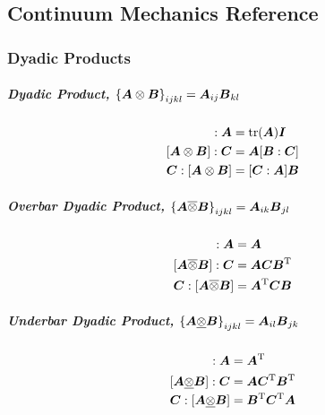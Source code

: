\documentclass[10pt,letterpaper,oneside]{report}
\newcommand{\ten}[1]{\mbox{\boldmath $#1$}{}}
\newcommand{\scas}[1]{\mbox{{\scriptsize{${\rm{#1}}$}}}{}}
\begin{document}
\begin{itemize}
\appendix

\chapter{Continuum Mechanics Reference}

\subsection{Dyadic Products} 
\paragraph{Dyadic Product, $\left\lbrace \ten{A} \otimes \ten{B} \right\rbrace _{ijkl} = \ten{A}_{ij} \ten{B}_{kl} $}
\begin{align}
[\ten{I} \otimes \ten{I} ] : \ten{A} &= \mbox{tr} (\ten{A}) \ten{I} 
\\
[\ten{A} \otimes \ten{B}] : \ten{C} &= \ten{A} [\ten{B}:\ten{C}] 
\\
\ten{C}:[\ten{A} \otimes \ten{B}] &= [\ten{C}:\ten{A}] \ten{B} 
\end{align}

\paragraph{Overbar Dyadic Product, $\left\lbrace \ten{A} \overline{\otimes} \ten{B} \right\rbrace _{ijkl} = \ten{A}_{ik} \ten{B}_{jl}$}
\begin{align}
[\ten{I} \overline{\otimes} \ten{I} ] : \ten{A} &= \ten{A}  
\\
[\ten{A} \overline{\otimes} \ten{B}] : \ten{C} &= \ten{A} \ten{C} \ten{B}^{\scas{T}} 
\\
\ten{C}:[\ten{A} \overline{\otimes} \ten{B}] &= \ten{A}^{\scas{T}} \ten{C} \ten{B} 
\\
\end{align}

\paragraph{Underbar Dyadic Product, $\left\lbrace \ten{A} \underline{\otimes} \ten{B} \right\rbrace _{ijkl} = \ten{A}_{il} \ten{B}_{jk}$}
\begin{align}
[\ten{I} \underline{\otimes} \ten{I} ] : \ten{A} &= \ten{A}^{\scas{T}}  
\\
[\ten{A} \underline{\otimes} \ten{B}] : \ten{C} &= \ten{A}\ten{C}^{\scas{T}} \ten{B}^{\scas{T}} 
\\
\ten{C}:[ \ten{A} \underline{\otimes} \ten{B}] &= \ten{B}^{\scas{T}} \ten{C}^{\scas{T}} \ten{A}
\end{align}



\end{itemize}
\end{document}
